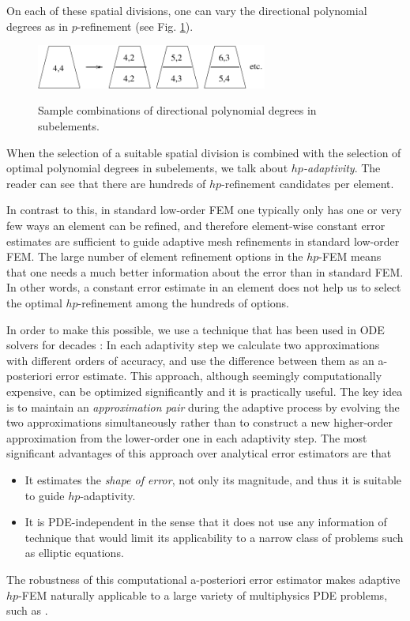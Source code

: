\documentclass[final,3p,times,twocolumn]{elsarticle}
\begin{document}
On each of these spatial divisions, one can vary the 
directional polynomial degrees as in $p$-refinement
(see Fig. \ref{fig:quadsplit2}). 

\begin{figure}[!htb]
\begin{center}
 {
\includegraphics[width=7.6cm]{quad_split_2.pdf}
}
\end{center}
\vspace{-5mm}
\caption{Sample combinations of directional polynomial degrees in 
         subelements.}
\label{fig:quadsplit2}
\end{figure}

When the selection of a suitable spatial division is combined 
with the selection of optimal polynomial degrees in 
subelements, we talk about {\em $hp$-adaptivity}. 
The reader can see that there are hundreds of $hp$-refinement 
candidates per element.

In contrast to this, in standard low-order FEM one 
typically only has one or very few ways an element 
can be refined, and therefore element-wise constant 
error estimates are sufficient to guide adaptive 
mesh refinements in standard low-order FEM. 
The large number of element refinement options 
in the $hp$-FEM means that one needs a much better 
information about the error than in standard FEM.
In other words, a constant error estimate in an element
does not help us to select the optimal $hp$-refinement
among the hundreds of options.

In order to make this possible, we use a technique 
that has been used in ODE solvers for decades \cite{hairer}:
In each adaptivity step we calculate two approximations 
with different orders of accuracy, and use the
difference between them as an a-posteriori error 
estimate. This approach, although 
seemingly computationally expensive, can be optimized 
significantly \cite{pdeindep} and it is practically 
useful. The key idea is to maintain an {\em approximation 
pair} during the adaptive process by evolving the two 
approximations simultaneously rather than to construct 
a new higher-order approximation from the lower-order one 
in each adaptivity step. The most significant advantages 
of this approach over analytical error estimators are that

\begin{itemize}
\item It estimates the {\em shape of error}, not only 
      its magnitude, and thus it is suitable to 
      guide $hp$-adaptivity.
\item It is PDE-independent in the sense that it does
      not use any information of technique that would
      limit its applicability to a narrow class of problems
      such as elliptic equations.
\end{itemize} 
The robustness of this computational a-posteriori error 
estimator makes adaptive $hp$-FEM naturally applicable to a large variety 
of multiphysics PDE problems, such as \cite{spacetime-1,spacetime-2}. 
\end{document}
